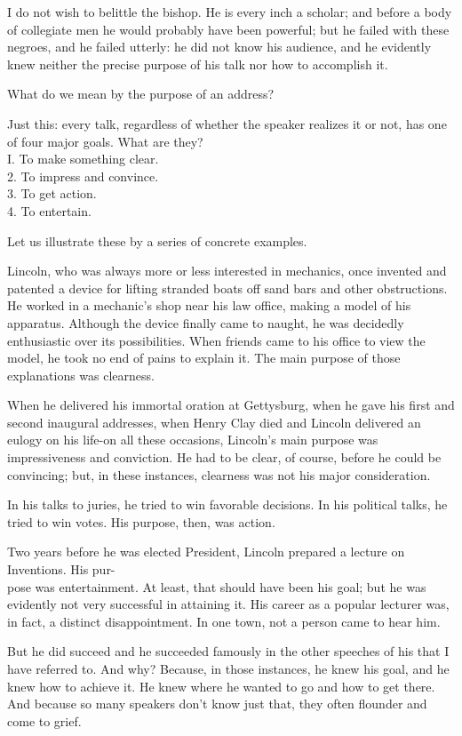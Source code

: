 \documentclass[10pt]{article}
\begin{document}
I do not wish to belittle the bishop. He is every inch a scholar; and before a body of collegiate men he would probably have been powerful; but he failed with these negroes, and he failed utterly: he did not know his audience, and he evidently knew neither the precise purpose of his talk nor how to accomplish it.

What do we mean by the purpose of an address?

Just this: every talk, regardless of whether the speaker realizes it or not, has one of four major goals. What are they?\\
I. To make something clear.\\
2. To impress and convince.\\
3. To get action.\\
4. To entertain.

Let us illustrate these by a series of concrete examples.

Lincoln, who was always more or less interested in mechanics, once invented and patented a device for lifting stranded boats off sand bars and other obstructions. He worked in a mechanic's shop near his law office, making a model of his apparatus. Although the device finally came to naught, he was decidedly enthusiastic over its possibilities. When friends came to his office to view the model, he took no end of pains to explain it. The main purpose of those explanations was clearness.

When he delivered his immortal oration at Gettysburg, when he gave his first and second inaugural addresses, when Henry Clay died and Lincoln delivered an eulogy on his life-on all these occasions, Lincoln's main purpose was impressiveness and conviction. He had to be clear, of course, before he could be convincing; but, in these instances, clearness was not his major consideration.

In his talks to juries, he tried to win favorable decisions. In his political talks, he tried to win votes. His purpose, then, was action.

Two years before he was elected President, Lincoln prepared a lecture on Inventions. His pur-\\
pose was entertainment. At least, that should have been his goal; but he was evidently not very successful in attaining it. His career as a popular lecturer was, in fact, a distinct disappointment. In one town, not a person came to hear him.

But he did succeed and he succeeded famously in the other speeches of his that I have referred to. And why? Because, in those instances, he knew his goal, and he knew how to achieve it. He knew where he wanted to go and how to get there. And because so many speakers don't know just that, they often flounder and come to grief.
\end{document}
